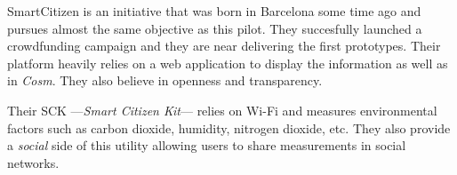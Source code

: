 \documentclass[a4paper,english]{article}
\begin{document}
            SmartCitizen is an initiative that was born in Barcelona some time ago and pursues almost the same objective as this pilot. They succesfully launched a crowdfunding campaign and they are near delivering the first prototypes. Their platform heavily relies on a web application to display the information as well as in \emph{Cosm}. They also believe in openness and transparency.

            Their SCK ---\emph{Smart Citizen Kit}--- relies on Wi-Fi and measures environmental factors such as carbon dioxide, humidity, nitrogen dioxide, etc. They also provide a \emph{social} side of this utility allowing users to share measurements in social networks.

            




\end{document}
